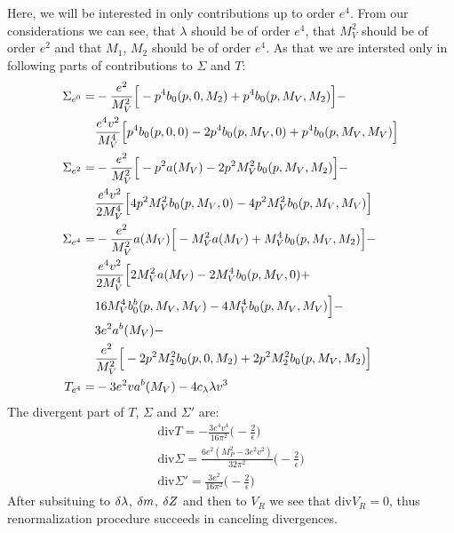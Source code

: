 Here, we will be interested in only contributions up to order $e^4$. From our \MSbar considerations 
we can see, that $\lambda$ should be of order $e^4$, that $M_V^2$ should be of order $e^2$ and 
that $M_1$, $M_2$ should be of order $e^4$. 
As that we are 
intersted only in following parts of contributions to $\Sigma$ and $T$:
\begin{align}
\Sigma_{e^0} = &-\frac{e^2}{M_V^2}\Big[-p^4b_0(p,0,M_2)+p^4b_0(p,M_V,M_2)\Big]-\notag \\
&\frac{e^4v^2}{M_V^4}\Big[p^4b_0(p,0,0)-2p^4b_0(p,M_V,0)+p^4b_0(p,M_V,M_V)\Big] \\
\Sigma_{e^2} = &-\frac{e^2}{M_V^2}\Big[-p^2a(M_V)-2p^2M_V^2b_0(p,M_V,M_2)\Big]-\notag \\
&\frac{e^4v^2}{2M_V^4}\Big[4p^2M_V^2b_0(p,M_V,0)-4p^2M_V^2b_0(p,M_V,M_V)\Big] \\
\Sigma_{e^4} = &-\frac{e^2}{M_V^2}a(M_V)\Big[-M_V^2a(M_V)+M_V^4b_0(p,M_V,M_2)\Big]-\notag \\
&\frac{e^4v^2}{2M_V^4}\Big[2M_V^2a(M_V)-2M_V^4b_0(p,M_V,0)+\notag \\
&16M_V^4b_0^b(p,M_V,M_V)-4M_V^4b_0(p,M_V,M_V)\Big]-\notag\\
&3e^2a^b(M_V)-\notag\\
&\frac{e^2}{M_V^2}\Big[-2p^2M_2^2b_0(p,0,M_2)+2p^2M_2^2b_0(p,M_V,M_2)\Big] \\
T_{e^4} = & -3e^2va^b(M_V)-4c_\lambda\lambda v^3
\end{align}
The divergent part of $T$, $\Sigma$ and $\Sigma'$ are:
\begin{align}
\textrm{div}T = -\frac{3e^4v^4}{16\pi^2}\Big(-\frac{2}{\epsilon}\Big)\\
\textrm{div}\Sigma = \frac{6e^2(M_P^2-3e^2v^2)}{32\pi^2}\Big(-\frac{2}{\epsilon}\Big)\\
\textrm{div}\Sigma' = \frac{3e^2}{16\pi^2}\Big(-\frac{2}{\epsilon}\Big)
\end{align}
After subsituing to $\delta\lambda$, $\delta m$, $\delta Z$ and then to $V_R$ we see that $\textrm{div}V_R = 0$, 
thus renormalization procedure succeeds in canceling divergences.
